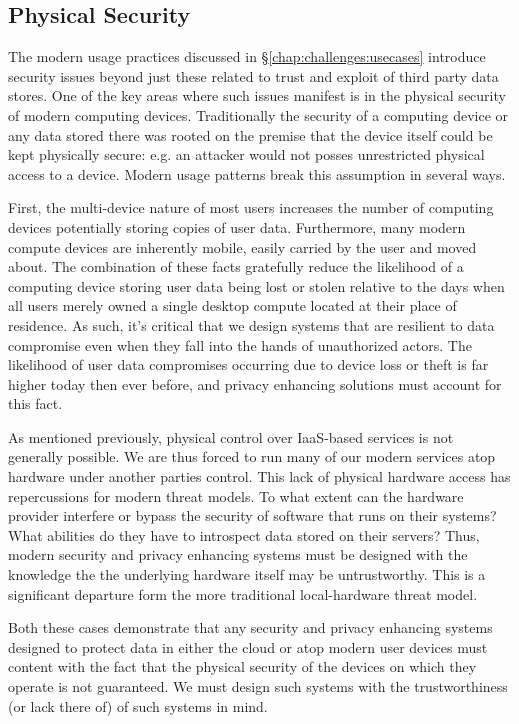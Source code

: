 \subsection{Physical Security}

The modern usage practices discussed in
\S\ref{chap:challenges:usecases} introduce security issues beyond just
these related to trust and exploit of third party data stores. One of
the key areas where such issues manifest is in the physical security
of modern computing devices. Traditionally the security of a computing
device or any data stored there was rooted on the premise that the
device itself could be kept physically secure: e.g. an attacker would
not posses unrestricted physical access to a device. Modern usage
patterns break this assumption in several ways.

First, the multi-device nature of most users increases the number of
computing devices potentially storing copies of user
data. Furthermore, many modern compute devices are inherently mobile,
easily carried by the user and moved about. The combination of these
facts gratefully reduce the likelihood of a computing device storing
user data being lost or stolen relative to the days when all users
merely owned a single desktop compute located at their place of
residence. As such, it's critical that we design systems that are
resilient to data compromise even when they fall into the hands of
unauthorized actors. The likelihood of user data compromises occurring
due to device loss or theft is far higher today then ever before, and
privacy enhancing solutions must account for this fact.

As mentioned previously, physical control over IaaS-based services is
not generally possible. We are thus forced to run many of our modern
services atop hardware under another parties control. This lack of
physical hardware access has repercussions for modern threat
models. To what extent can the hardware provider interfere or bypass
the security of software that runs on their systems? What abilities do
they have to introspect data stored on their servers? Thus, modern
security and privacy enhancing systems must be designed with the
knowledge the the underlying hardware itself may be
untrustworthy. This is a significant departure form the more
traditional local-hardware threat model.

Both these cases demonstrate that any security and privacy enhancing
systems designed to protect data in either the cloud or atop modern
user devices must content with the fact that the physical security of
the devices on which they operate is not guaranteed. We must design
such systems with the trustworthiness (or lack there of) of such
systems in mind.

